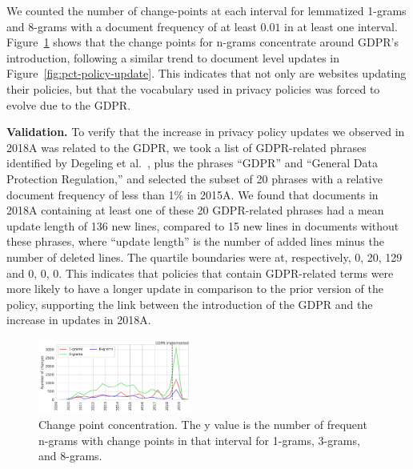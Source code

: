 We counted the number of change-points at each interval for lemmatized 1-grams and 8-grams with a document frequency of at least $0.01$ in at least one interval.
Figure~\ref{fig:changepoints} shows that the change points for n-grams concentrate around GDPR's introduction, following a similar trend to document level updates in Figure~\ref{fig:pct-policy-update}. This indicates that not only are websites updating their policies, but that the vocabulary used in privacy policies was forced to evolve due to the GDPR.


\textbf{Validation.} To verify that the increase in privacy policy updates we observed in 2018A was related to the GDPR, we took a list of GDPR-related phrases identified by Degeling et al.~\cite{degeling2018we}, plus the phrases “GDPR” and “General Data Protection Regulation,” and selected the subset of 20 phrases with a relative document frequency of less than 1\% in 2015A. We found that documents in 2018A containing at least one of these 20 GDPR-related phrases had a mean update length of 136 new lines, compared to 15 new lines in documents without these phrases, where “update length” is the number of added lines minus the number of deleted lines. The quartile boundaries were at, respectively, 0, 20, 129 and 0, 0, 0. This indicates that policies that contain GDPR-related terms were more likely to have a longer update in comparison to the prior version of the policy, supporting the link between the introduction of the GDPR and the increase in updates in 2018A.

\begin{figure}
    \centering
    \includegraphics[width=0.45\textwidth]{figures/changepoints.pdf}
    \caption{Change point concentration. The y value is the number of frequent n-grams with change points in that interval for 1-grams, 3-grams, and 8-grams.}
    
    \label{fig:changepoints}
\end{figure}
